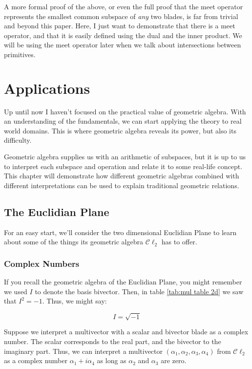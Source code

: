 \documentclass[10pt]{report}
\begin{document}
A more formal proof of the above, or even the full proof that the
meet operator represents the smallest common subspace of
\emph{any} two blades, is far from trivial and beyond this paper.
Here, I just want to demonstrate that there is a meet operator,
and that it is easily defined using the dual and the inner
product. We will be using the meet operator later when we talk
about intersections between primitives.

\chapter{Applications}

Up until now I haven't focused on the practical value of geometric
algebra. With an understanding of the fundamentals, we can start
applying the theory to real world domains. This is where geometric
algebra reveals its power, but also its difficulty.

Geometric algebra supplies us with an arithmetic of subspaces, but
it is up to us to interpret each subspace and operation and relate
it to some real-life concept. This chapter will demonstrate how
different geometric algebras combined with different
interpretations can be used to explain traditional geometric
relations.

\section{The Euclidian Plane}

For an easy start, we'll consider the two dimensional Euclidian
Plane to learn about some of the things its geometric algebra
$\mathcal{C}\ell_2$ has to offer.

\subsection{Complex Numbers}

If you recall the geometric algebra of the Euclidian Plane, you
might remember we used $I$ to denote the basis bivector. Then, in
table \ref{tab:mul table 2d} we saw that $I^2 = -1$. Thus, we
might say:

\begin{displaymath}
    I = \sqrt{-1}
\end{displaymath}

Suppose we interpret a multivector with a scalar and bivector
blade as a complex number. The scalar corresponds to the real
part, and the bivector to the imaginary part. Thus, we can
interpret a multivector $(\alpha_1, \alpha_2, \alpha_3, \alpha_4)$
from $\mathcal{C}\ell_2$ as a complex number $\alpha_1+i\alpha_4$
as long as $\alpha_2$ and $\alpha_3$ are zero.
\end{document}

